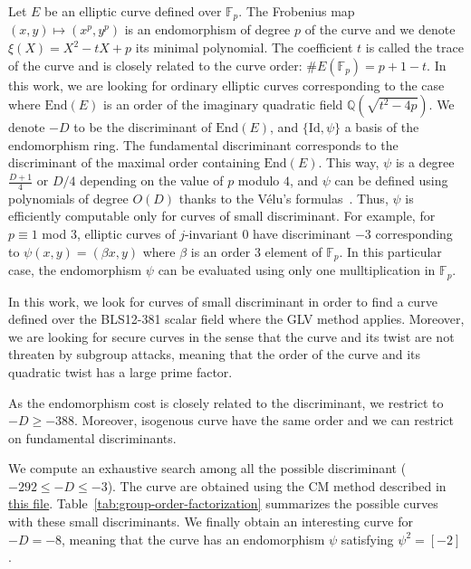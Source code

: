 \documentclass{amsart}
\newcommand{\Q}{\ensuremath{\mathbb Q}}
\newcommand{\Fp}{\ensuremath{\mathbb F_p}}
\newcommand{\End}{\ensuremath{\text{End}}}
\begin{document}
Let $E$ be an elliptic curve defined over $\Fp$. The Frobenius
map $(x,y)\mapsto (x^p,y^p)$ is an endomorphism of degree $p$ of the
curve and we denote $\xi(X) = X^2 - tX + p$ its minimal polynomial.
The coefficient $t$ is called the trace of the curve and is closely
related to the curve order: $\#E(\Fp) = p+1-t$.
In this work, we are looking for ordinary elliptic curves
corresponding to the case where $\End(E)$ is an order of the imaginary
quadratic field $\Q(\sqrt{t^2-4p})$.
We denote $-D$ to be the discriminant of $\End(E)$, and $\{\text{Id},\psi\}$
a basis of the endomorphism ring. The fundamental discriminant
corresponds to the discriminant of the maximal order containing $\End(E)$.
This way, $\psi$ is a degree $\frac{D+1}4$ or $D/4$ depending on the
value of $p$ modulo $4$, and $\psi$ can be defined using polynomials
of degree $O(D)$ thanks to the Vélu's formulas~\cite{velu71}.
Thus, $\psi$ is efficiently computable only for curves of small discriminant.
For example, for $p\equiv 1$ mod $3$, elliptic curves of $j$-invariant $0$
have discriminant $-3$ corresponding to $\psi(x,y) = (\beta x, y)$
where $\beta$ is an order $3$ element of $\Fp$.
In this particular case, the endomorphism $\psi$ can be evaluated
using only one mulltiplication in $\Fp$.

In this work, we look for curves of small discriminant in order to
find a curve defined over the BLS12-381 scalar field where the GLV
method applies. Moreover, we are looking for secure curves in the
sense that the curve and its twist are not threaten by subgroup
attacks, meaning that the order of the curve and its quadratic twist
has a large prime factor.

As the endomorphism cost is closely related to the discriminant, we
restrict to $-D \geq -388$. Moreover, isogenous curve have the same
order and we can restrict on fundamental discriminants.

We compute an exhaustive search among all the possible discriminant
($-292 \leq -D \leq -3$). The curve are obtained using the CM method
described in
\href{https://github.com/asanso/Bandersnatch/blob/main/code/small-disc-curves.py}{this
  file}. Table~\ref{tab:group-order-factorization} summarizes the possible curves with
these small discriminants.
We finally obtain an interesting curve for $-D = -8$, meaning that the
curve has an endomorphism $\psi$ satisfying $\psi^2 = [-2]$.

                            
\end{document}
